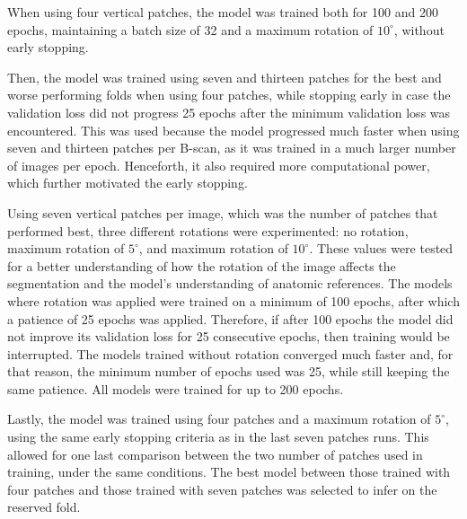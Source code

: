 When using four vertical patches, the model was trained both for 100 and 200 epochs, maintaining a batch size of 32 and a maximum rotation of $10^{\circ}$, without early stopping. 
\par
Then, the model was trained using seven and thirteen patches for the best and worse performing folds when using four patches, while stopping early in case the validation loss did not progress 25 epochs after the minimum validation loss was encountered. This was used because the model progressed much faster when using seven and thirteen patches per B-scan, as it was trained in a much larger number of images per epoch. Henceforth, it also required more computational power, which further motivated the early stopping.
\par
Using seven vertical patches per image, which was the number of patches that performed best, three different rotations were experimented: no rotation, maximum rotation of $5^{\circ}$, and maximum rotation of $10^{\circ}$. These values were tested for a better understanding of how the rotation of the image affects the segmentation and the model's understanding of anatomic references. The models where rotation was applied were trained on a minimum of 100 epochs, after which a patience of 25 epochs was applied. Therefore, if after 100 epochs the model did not improve its validation loss for 25 consecutive epochs, then training would be interrupted. The models trained without rotation converged much faster and, for that reason, the minimum number of epochs used was 25, while still keeping the same patience. All models were trained for up to 200 epochs.
\par
Lastly, the model was trained using four patches and a maximum rotation of $5^{\circ}$, using the same early stopping criteria as in the last seven patches runs. This allowed for one last comparison between the two number of patches used in training, under the same conditions. The best model between those trained with four patches and those trained with seven patches was selected to infer on the reserved fold.

